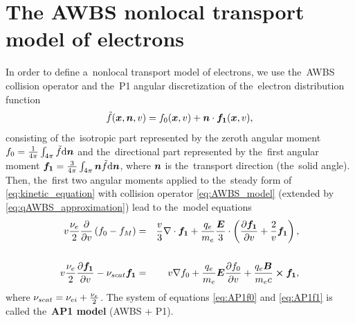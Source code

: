 \section{The AWBS nonlocal transport model of electrons}
\label{sec:AWBSnonlocal}

In order to define a~nonlocal transport model of electrons, 
we use the~AWBS collision operator and the~P1 angular 
discretization of the~electron distribution function
\begin{equation}
  \tilde{f}(\boldsymbol{x}, \boldsymbol{n}, v) = 
  f_0(\boldsymbol{x}, v) + \boldsymbol{n}\cdot\boldsymbol{f_1}(\boldsymbol{x}, v) , 
  \label{eq:P1approximation}
\end{equation}
consisting of the~isotropic part represented by the zeroth angular moment 
$f_0 = \frac{1}{4\pi}\int_{4\pi} \tilde{f} \text{d}\boldsymbol{n}$ 
and the~directional part represented by the~first angular moment 
$\boldsymbol{f_1} = \frac{3}{4\pi}\int_{4\pi} \boldsymbol{n}
\tilde{f} \text{d}\boldsymbol{n}$, where $\boldsymbol{n}$ is the~transport direction (the~solid angle).
Then, the~first two angular moments
\cite{Shkarofsky_Particle_Kinetics_book_1966_24} applied to the~steady form of 
\eqref{eq:kinetic_equation} with collision operator \eqref{eq:AWBS_model} 
(extended by \eqref{eq:qAWBS_approximation}) lead to the~model equations
\begin{eqnarray}
  v\frac{\nu_{e}}{2}\frac{\partial{}}{\partial{v}}\left(f_0 - f_M \right) &=&
  \frac{v}{3}\nabla\cdot\boldsymbol{f_1} + \frac{q_e}{m_e}\frac{\boldsymbol{E}}{3}\cdot\left(
  \frac{\partial{\boldsymbol{f_1}}}{\partial{v}} + \frac{2}{v}\boldsymbol{f_1}\right) , 
  \nonumber \\
  \label{eq:AP1f0}\\
  v\frac{\nu_{e}}{2}\frac{\partial{\boldsymbol{f_1}}}{\partial{v}}
  - \nu_{scat}\boldsymbol{f_1} &=& 
  v\nabla f_0 + 
  \frac{q_e}{m_e}\boldsymbol{E}\frac{\partial{f_0}}{\partial{v}} 
  +\frac{q_e\boldsymbol{B}}{m_e c}\boldsymbol{\times} \boldsymbol{f_1}
  ,
  \nonumber \\
  \label{eq:AP1f1}
\end{eqnarray}
where $\nu_{scat} = \nu_{ei} + \frac{\nu_{e}}{2}$. The system of equations 
\eqref{eq:AP1f0} and \eqref{eq:AP1f1} is called the~{\bf AP1 model} 
(AWBS + P1).  

